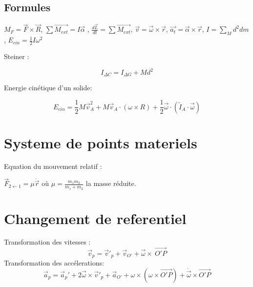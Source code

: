 \documentclass[10pt,a4paper]{article}
\begin{document}
\subsection{Formules}
$M_F = \vec F \times \vec R$,
$\sum \vec{M_{ext}} = I\vec{\alpha}$ ,
$\frac{d\vec{L}}{dt} = \sum \vec{M_{ext}}$,
$\vec{v} = \vec{\omega} \times \vec{r}$,
$\vec{a_t} = \vec{\alpha} \times \vec{r}$,
$I = \sum \limits_M d^2 dm$,
$E_{cin} = \frac{1}{2}I\omega^2$

Steiner :

$$I_{\Delta C} = I_{\Delta G} + M d^2$$

Energie cinétique d'un solide:

$$E_{cin} = \frac{1}{2} M \vec{v}_A^2 + M \vec{v}_A \cdot \left(\omega \times R \right)  + \frac{1}{2} \vec\omega \cdot \left(\tilde{I}_A \cdot \vec\omega \right)$$

\section{Systeme de points materiels}

Equation du mouvement relatif :

\begin{center}
$\vec{F}_{2 \leftarrow 1} = \mu \ddot\vec{r}$ où $\mu = \frac{m_1 m_2}{m_1 + m_2}$ la masse réduite.
\end{center}

\section{Changement de referentiel}
Transformation des vitesses :
$$\vec{v}_p = \vec{v}'_p + \vec{v}_{O'} + \vec\omega \times \ \vec{O'P} $$
Transformation des accélerations:
$$\vec{a}_p = \vec{a}_p' + 2\vec\omega \times  \vec{v}'_p + \vec{a}_{O'} + \omega \times \left(\omega \times \vec{O'P}\right) + \dot{\vec\omega} \times \vec{O'P}$$
\end{document}
